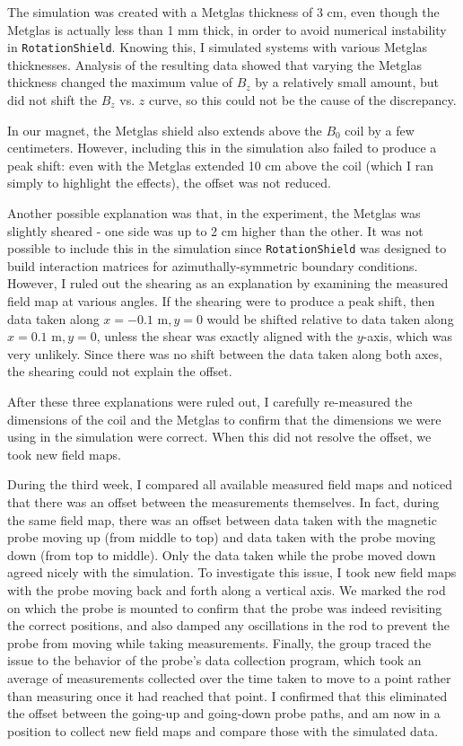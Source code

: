 \documentclass[twocolumn,aps,prb,citeautoscript]{revtex4-1}
\begin{document}
The simulation was created with a Metglas thickness of 3 cm, even though the Metglas is actually less than 1 mm thick,
in order to avoid numerical instability in \texttt{RotationShield}. Knowing this, I simulated systems with various
Metglas thicknesses. Analysis of the resulting data showed that varying the Metglas thickness
changed the maximum value
of $B_z$ by a relatively small amount, but did not shift the $B_z$ vs. $z$ curve, so this could not be the cause of
the discrepancy.

In our magnet, the Metglas shield also extends above the $B_0$ coil by a few centimeters. However, including this
in the simulation also failed to produce a peak shift: even with the Metglas extended 10 cm above the coil (which
I ran simply to highlight the effects), the offset was not reduced.

Another possible explanation was that, in the experiment, the Metglas was slightly sheared - one side was up to
2 cm higher than the other. It was not possible to include this in the simulation since \texttt{RotationShield} was
designed to build interaction matrices for azimuthally-symmetric boundary conditions. However, I ruled out the
shearing as an explanation by examining the measured field map at various angles. If the shearing were to
produce a peak shift, then data taken along $x = -0.1 \text{ m}, y = 0$ would be shifted relative to data
taken along $x = 0.1 \text{ m}, y = 0$, unless the shear was exactly aligned with the $y$-axis, which was
very unlikely.
Since there was no shift between the data taken along both axes, the shearing could not explain the offset.

After these three explanations were ruled out, I carefully re-measured the dimensions of the coil and the
Metglas to confirm that the dimensions we were using in the simulation were correct. When this did not
resolve the offset, we took new field maps.

During the third week, I compared all available measured field maps and noticed that there was an offset between
the measurements themselves. In fact, during the same field map,
there was an offset between data taken with the magnetic probe
moving up (from middle to top) and data taken with the probe moving down (from top to middle).
Only the data taken while the probe moved down agreed nicely with the simulation.
To investigate
this issue, I took new field maps with the probe moving back and forth along a vertical axis. We marked the rod
on which the probe is mounted to confirm that the probe was indeed revisiting the correct positions, and also
damped any oscillations in the rod to prevent the probe from moving while taking measurements. Finally,
the group traced the issue to the behavior of the probe's data collection program, which took an average of
measurements collected over the time taken to move to a point rather than measuring once it had reached that point.
I confirmed that this eliminated the offset between the going-up and going-down probe paths, and am now in a position
to collect new field maps and compare those with the simulated data.
\end{document}
